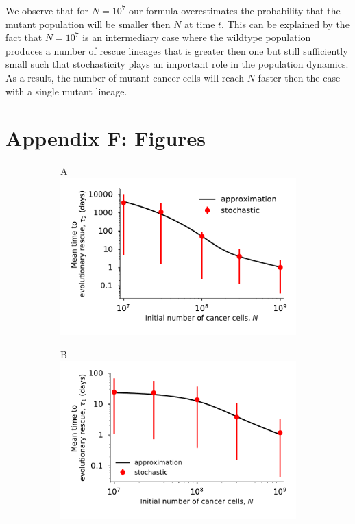 \documentclass[12pt]{extarticle}
\begin{document}
\begin{appendices}
We observe that for $N=10^7$ our formula overestimates the probability that the mutant population will be smaller then $N$ at time $t$.  This can be explained by the fact that $N=10^7$ is an intermediary case where the wildtype population produces a number of rescue lineages that is greater then one but still sufficiently small such that stochasticity plays an important role in the population dynamics. As a result, the number of mutant cancer cells will reach $N$ faster then the case with a single mutant lineage.
\newpage

\section*{Appendix F: Figures}

\begin{figure}[!htb]
\begin{subfigure}{0.5\textwidth}
A\\
\includegraphics[width=1\textwidth]{Figures/EvolutionaryRescueTime.pdf}
\end{subfigure}
\begin{subfigure}{0.5\textwidth}
B\\
\includegraphics[width=1\textwidth]{Figures/MeanTimeGrowthMutantDirectPlot.pdf}

\end{subfigure}
\end{figure}
\end{appendices}
\end{document}
